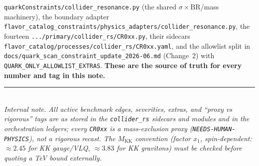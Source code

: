 \documentclass[11pt]{article}
\newcommand{\MKK}{M_{\mathrm{KK}}}
\newcommand{\sBR}{\sigma\!\times\!\mathrm{BR}}
\newcommand{\code}[1]{\texttt{#1}}
\theoremstyle{definition}
\begin{document}
\begin{description}[leftmargin=0em,style=nextline]
\item[Repo code.] \code{quarkConstraints/collider\_resonance.py} (the shared
$\sBR$/mass machinery), the boundary adapter
\code{flavor\_catalog\_constraints/physics\_adapters/collider\_resonance.py}, the
fourteen \code{.../primary/collider\_rs/CR0xx.py}, their sidecars
\code{flavor\_catalog/processes/collider\_rs/CR0xx.yaml}, and the allowlist split
in \code{docs/quark\_scan\_constraint\_update\_2026-06.md} (Change~2) with
\code{QUARK\_ONLY\_ALLOWLIST\_EXTRAS}. \textbf{These are the source of truth for
every number and tag in this note.}
\end{description}

\bigskip
\noindent\rule{\linewidth}{0.4pt}\\
\footnotesize
\emph{Internal note. All active benchmark edges, severities, extras, and
``proxy vs rigorous'' tags are as stored in the \code{collider\_rs} sidecars and
modules and in the orchestration ledgers; every \code{CR0xx} is a
mass-exclusion \emph{proxy} (\code{NEEDS-HUMAN-PHYSICS}), not a rigorous recast.
The $\MKK$ convention (factor $x_1$, spin-dependent: $\approx 2.45$ for KK
gauge/VLQ, $\approx 3.83$ for KK gravitons) must be checked before quoting a
TeV bound externally.}
\end{document}
